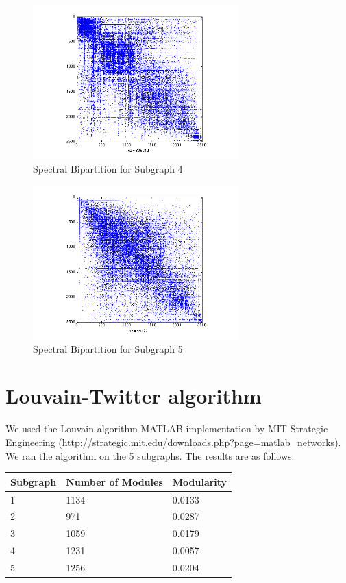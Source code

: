 \documentclass[11pt]{article}
\begin{document}
		 \begin{figure}
		 		\begin{center}
		  		\includegraphics[width=300px]{../graphs/spectral_partition_a4.png}
		  	\end{center}
		  	\caption{Spectral Bipartition for Subgraph 4}
		  	\label{fig:sb4}
		 \end{figure}
		 
		 \begin{figure}
		 		\begin{center}
		  		\includegraphics[width=300px]{../graphs/spectral_partition_a5.png}
		  	\end{center}
		  	\caption{Spectral Bipartition for Subgraph 5}
		  	\label{fig:sb5}
		 \end{figure}
		  

\section{Louvain-Twitter algorithm}
We used the Louvain algorithm MATLAB implementation by MIT Strategic Engineering (\url{http://strategic.mit.edu/downloads.php?page=matlab_networks}). We ran the algorithm on the 5 subgraphs. The results are as follows:

\begin{table}[!htbp]
		\begin{tabular}{lll}
		Subgraph & Number of Modules & Modularity \\
	  \hline
		1 & 1134 & 0.0133 \\
		2 & 971 & 0.0287 \\
		3 & 1059 & 0.0179 \\
		4 & 1231 & 0.0057 \\
		5 & 1256 & 0.0204 \\
		\end{tabular}
\end{table}

     
\end{document}
